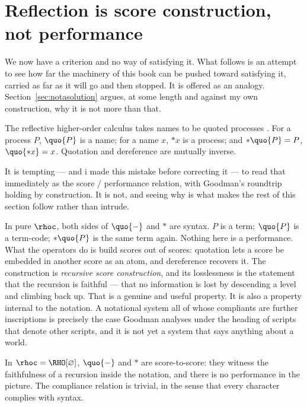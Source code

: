 \section{Reflection is score construction, not performance}
\label{sec:rho-builtins}

We now have a criterion and no way of satisfying it.
What follows is an attempt to see how far the machinery of this
book can be pushed toward satisfying it, carried as far as it will
go and then stopped.
It is offered as an analogy.
Section~\ref{sec:notasolution} argues, at some length and against
my own construction, why it is not more than that.

The reflective higher-order calculus takes names to be quoted
processes \cite{meredith2005rho}.
For a process $P$, $\quo{P}$ is a name; for a name $x$, $*x$ is a
process; and $*\quo{P} = P$, $\quo{*x} = x$.
Quotation and dereference are mutually inverse.

It is tempting --- and i made this mistake before correcting it ---
to read that immediately as the score / performance relation, with
Goodman's roundtrip holding by construction.
It is not, and seeing why is what makes the rest of this section
follow rather than intrude.

In pure $\rhoc$, both sides of $\quo{-}$ and $*$ are syntax.
$P$ is a term; $\quo{P}$ is a term-code; $*\quo{P}$ is the same
term again.
Nothing here is a performance.
What the operators do is build scores out of scores: quotation lets
a score be embedded in another score as an atom, and dereference
recovers it.
The construction is \emph{recursive score construction}, and its
losslessness is the statement that the recursion is faithful ---
that no information is lost by descending a level and climbing back
up.
That is a genuine and useful property.
It is also a property internal to the notation.
A notational system all of whose compliants are further
inscriptions is precisely the case Goodman analyses under the
heading of scripts that denote other scripts, and it is not yet a
system that says anything about a world.

\begin{observation}
\label{obs:tworeadings}
In $\rhoc = \RHO[\varnothing]$, $\quo{-}$ and $*$ are
score-to-score: they witness the faithfulness of a recursion inside
the notation, and there is no performance in the picture.
The compliance relation is trivial, in the sense that every
character complies with syntax.
\end{observation}

